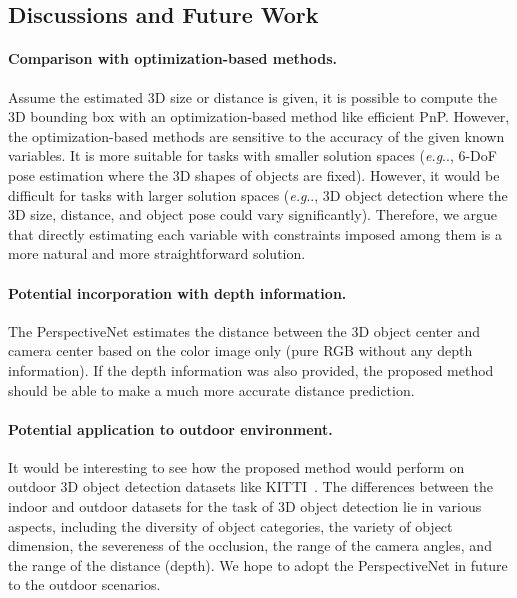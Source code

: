 \documentclass{article}
\makeatletter
\DeclareRobustCommand\onedot{\futurelet\@let@token\@onedot}
\def\@onedot{\ifx\@let@token.\else.\null\fi\xspace}
\def\eg{\emph{e.g}\onedot} \def\Eg{\emph{E.g}\onedot}
\makeatother
\begin{document}
\subsection{Discussions and Future Work}

\paragraph{Comparison with optimization-based methods.}

Assume the estimated 3D size or distance is given, it is possible to compute the 3D bounding box with an optimization-based method like efficient PnP. However, the optimization-based methods are sensitive to the accuracy of the given known variables. It is more suitable for tasks with smaller solution spaces (\eg, 6-DoF pose estimation where the 3D shapes of objects are fixed). However, it would be difficult for tasks with larger solution spaces (\eg, 3D object detection where the 3D size, distance, and object pose could vary significantly). Therefore, we argue that directly estimating each variable with constraints imposed among them is a more natural and more straightforward solution.

\paragraph{Potential incorporation with depth information.}

The PerspectiveNet estimates the distance between the 3D object center and camera center based on the color image only (pure RGB without any depth information). If the depth information was also provided, the proposed method should be able to make a much more accurate distance prediction.

\paragraph{Potential application to outdoor environment.}

It would be interesting to see how the proposed method would perform on outdoor 3D object detection datasets like KITTI~\cite{geiger2013vision}. The differences between the indoor and outdoor datasets for the task of 3D object detection lie in various aspects, including the diversity of object categories, the variety of object dimension, the severeness of the occlusion, the range of the camera angles, and the range of the distance (depth). We hope to adopt the PerspectiveNet in future to the outdoor scenarios.
\end{document}
